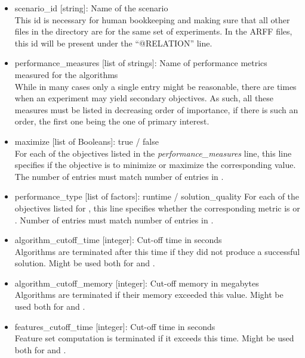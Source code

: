 \begin{itemize}
	\item scenario\_id [string]: Name of the scenario\\ 
		This id is necessary for human bookkeeping and making sure that all
		other files in the directory are for the same set of experiments. In the ARFF files, this id will be present 
		under the ``@RELATION'' line.
  	\item performance\_measures [list of strings]: Name of performance metrics measured for 
		the algorithms\\
		While in many cases only a single entry might be reasonable, there are times when an 
		experiment may yield secondary objectives. As such, all these measures must be listed in decreasing 
		order of importance, if there is such an order, the first one being the one of primary interest.
  	\item maximize [list of Booleans]: true / false\\ 
  	    For each of the objectives listed in the \textit{performance\_measures} line,
		this line specifies if the objective is to minimize or maximize the corresponding value. The number of entries 
		must match number of entries in .
  	\item performance\_type [list of factors]: runtime / solution\_quality
  	    For each of the objectives listed for ,
		this line specifies whether the corresponding metric is 
		or . Number of entries must match number of entries in 
		.
 	\item algorithm\_cutoff\_time [integer]: Cut-off time in seconds\\ 
 	    Algorithms are terminated after this time if they did 
		not produce a successful solution. Might be used both for  and .
  	\item algorithm\_cutoff\_memory [integer]: Cut-off memory in megabytes\\
  	    Algorithms are terminated if their memory
		exceeded this value. Might be used both for  and .
  	\item features\_cutoff\_time [integer]: Cut-off time in seconds\\
  	    Feature set computation is terminated if it exceeds 
		this time. Might be used both for  and .

\end{itemize}
